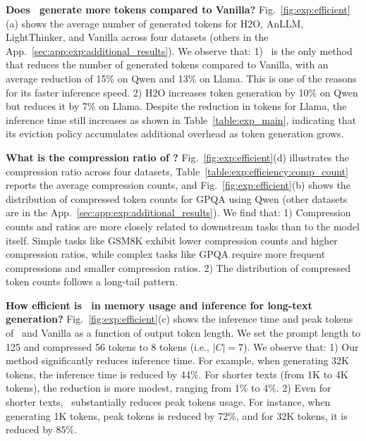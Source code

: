 \textbf{Does \ours~generate more tokens compared to Vanilla?}
Fig.~\ref{fig:exp:efficient}(a) shows the average number of generated tokens for H2O, AnLLM, LightThinker, and Vanilla across four datasets (others in the App.~\ref{sec:app:exp:additional_results}). 
We observe that:
1) \ours~is the only method that reduces the number of generated tokens compared to Vanilla, with an average reduction of 15\% on Qwen and 13\% on Llama. 
This is one of the reasons for its faster inference speed.
2) H2O increases token generation by 10\% on Qwen but reduces it by 7\% on Llama. 
Despite the reduction in tokens for Llama, the inference time still increases as shown in Table~\ref{table:exp_main}, indicating that its eviction policy accumulates additional overhead as token generation grows.

\textbf{What is the compression ratio of \ours?}
Fig.~\ref{fig:exp:efficient}(d) illustrates the compression ratio across four datasets, 
Table~\ref{table:exp:efficiency:comp_count} reports the average compression counts, 
and Fig.~\ref{fig:exp:efficient}(b) shows the distribution of compressed token counts for GPQA using Qwen (other datasets are in the App.~\ref{sec:app:exp:additional_results}). 
We find that:
1) Compression counts and ratios are more closely related to downstream tasks than to the model itself. 
Simple tasks like GSM8K exhibit lower compression counts and higher compression ratios, while complex tasks like GPQA require more frequent compressions and smaller compression ratios. 
2) The distribution of compressed token counts follows a long-tail pattern. 

\textbf{How efficient is \ours~in memory usage and inference for long-text generation?}
Fig.~\ref{fig:exp:efficient}(c) shows the inference time and peak tokens of \ours~and Vanilla as a function of output token length.
We set the prompt length to 125 and compressed 56 tokens to 8 tokens (i.e., $|C|=7$).
We observe that:
1) Our method significantly reduces inference time. %
For example, when generating 32K tokens, the inference time is reduced by 44\%. 
For shorter texts (from 1K to 4K tokens), the reduction is more modest, ranging from 1\% to 4\%.
2) Even for shorter texts, \ours~substantially reduces peak tokens usage. 
For instance, when generating 1K tokens, peak tokens is reduced by 72\%, and for 32K tokens, it is reduced by 85\%.


